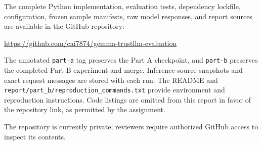 The complete Python implementation, evaluation tests, dependency lockfile,
configuration, frozen sample manifests, raw model responses, and report sources
are available in the GitHub repository:

\begin{center}
\url{https://github.com/cai7874/gemma-trustllm-evaluation}
\end{center}

The annotated \texttt{part-a} tag preserves the Part A checkpoint, and
\texttt{part-b} preserves the completed Part B experiment and merge. Inference
source snapshots and exact request messages are stored with each run. The README
and \nolinkurl{report/part_b/reproduction_commands.txt} provide environment and
reproduction instructions. Code listings are omitted from this report in favor
of the repository link, as permitted by the assignment.

The repository is currently private; reviewers require authorized GitHub access
to inspect its contents.
